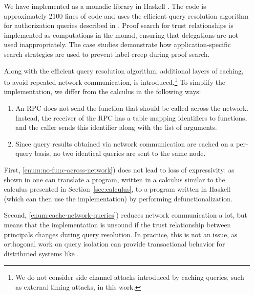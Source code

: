 We have implemented \lang{} as a monadic library in Haskell \cite{flamiolib}. The code is approximately 2100 lines of code and uses the efficient query resolution algorithm for authorization queries described in \cite{Arden:2015:FA:2859845.2859998}. Proof search for trust relationships is implemented as computations in the \lang{} monad, ensuring that delegations are not used inappropriately. The case studies demonstrate how application-specific search strategies are used to prevent label creep during proof search.

Along with the efficient query resolution algorithm, additional layers of caching, to avoid repeated network communication, is introduced.\footnote{We do not consider side channel attacks introduced by caching queries, such as external timing attacks, in this work.}
To simplify the implementation, we differ from the calculus in the following ways:
\begin{enumerate}
    \item \label{enum:no-func-across-network} An RPC does not send the function that should be called across the network. Instead, the receiver of the RPC has a table mapping identifiers to functions, and the caller sends this identifier along with the list of arguments.
    \item \label{enum:cache-network-queries} Since query results obtained via network communication are cached on a per-query basis, no two identical queries are sent to the same node.
\end{enumerate}

First, \ref{enum:no-func-across-network}) does not lead to loss of expressivity: as shown in \cite{Cooper:2009:RC:1599410.1599439} one can translate a program, written in a calculus similar to the calculus presented in Section~\ref{sec:calculus}, to a program written in Haskell (which can then use the \lang{} implementation) by performing defunctionalization.

Second, \ref{enum:cache-network-queries}) reduces network communication a lot, but means that the implementation is unsound if the trust relationship between principals changes during query resolution. In practice, this is not an issue, as orthogonal work on query isolation \cite{Liu:2009:FPS:1629575.1629606} can provide transactional behavior for distributed systems like \lang.

